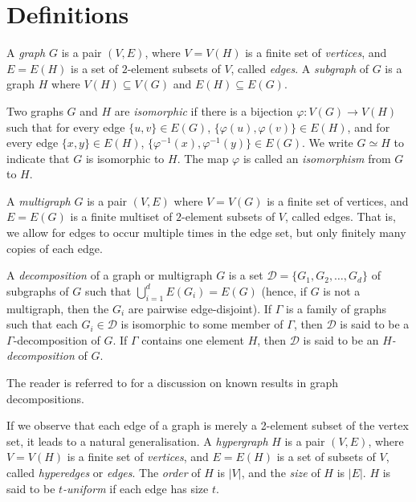 \section{Definitions}


A {\em graph} $G$ is a pair $(V, E)$, where $V = V(H)$ is a finite set of {\em vertices}, and $E = E(H)$ is a set of $2$-element subsets of $V$, called {\em edges}.
A {\em subgraph} of $G$ is a graph $H$ where $V(H) \subseteq V(G)$ and $E(H) \subseteq E(G)$.

Two graphs $G$ and $H$ are {\em isomorphic} if there is a bijection $\varphi : V(G) \to V(H)$ such that for every edge $\{u, v\} \in E(G)$, $\{\varphi(u), \varphi(v)\} \in E(H)$, and for every edge $\{x, y\} \in E(H)$, $\{\varphi^{-1}(x), \varphi^{-1}(y)\} \in E(G)$.
We write $G \simeq H$ to indicate that $G$ is isomorphic to $H$.
The map $\varphi$ is called an {\em isomorphism} from $G$ to $H$.


A {\em multigraph} $G$ is a pair $(V, E)$ where $V = V(G)$ is a finite set of vertices, and $E = E(G)$ is a finite multiset of $2$-element subsets of $V$, called edges. That is, we allow for edges to occur multiple times in the
edge set, but only finitely many copies of each edge.

A {\em decomposition} of a graph or multigraph $G$ is a set $\mathcal{D} = \{G_1, G_2, \ldots, G_d\}$ of
subgraphs of $G$ such that $\bigcup_{i=1}^d E(G_i) = E(G)$ (hence, if $G$ is not a multigraph, then the $G_i$ are pairwise edge-disjoint).
If $\Gamma$ is a family of graphs such that each $G_i \in \mathcal{D}$ is isomorphic to some
member of $\Gamma$, then $\mathcal{D}$ is said to be a $\Gamma$-decomposition of $G$.
If $\Gamma$ contains one element $H$, then $\mathcal{D}$ is said to be an
{\em $H$-decomposition} of $G$.

The reader is referred to \cite{bryant-graph} for a discussion on known results
in graph decompositions.

If we observe that each edge of a graph is merely a 2-element subset of the
vertex set, it leads to a natural generalisation.
A {\em hypergraph} $H$ is a pair $(V, E)$, where $V = V(H)$ is a finite set of
{\em vertices}, and $E = E(H)$ is a set of subsets of $V$, called {\em
hyperedges} or {\em edges}.
The {\em order} of $H$ is $|V|$, and the {\em size} of $H$ is $|E|$.
$H$ is said to be {\em $t$-uniform} if each edge has size $t$.

